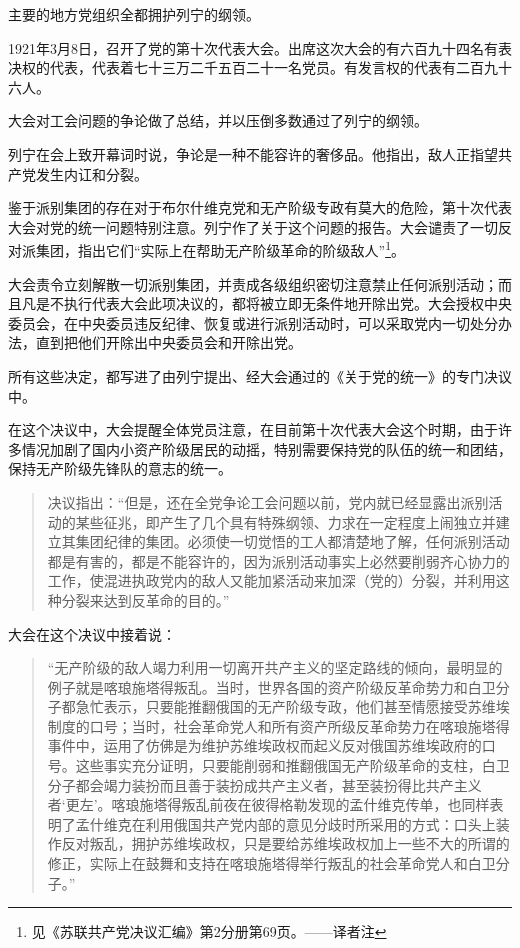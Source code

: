 主要的地方党组织全都拥护列宁的纲领。

1921年3月8日，召开了党的第十次代表大会。出席这次大会的有六百九十四名有表决权的代表，代表着七十三万二千五百二十一名党员。有发言权的代表有二百九十六人。

大会对工会问题的争论做了总结，并以压倒多数通过了列宁的纲领。

列宁在会上致开幕词时说，争论是一种不能容许的奢侈品。他指出，敌人正指望共产党发生内讧和分裂。

鉴于派别集团的存在对于布尔什维克党和无产阶级专政有莫大的危险，第十次代表大会对党的统一问题特别注意。列宁作了关于这个问题的报告。大会谴责了一切反对派集团，指出它们“实际上在帮助无产阶级革命的阶级敌人”\footnote{见《苏联共产党决议汇编》第2分册第69页。——译者注}。

大会责令立刻解散一切派别集团，并责成各级组织密切注意禁止任何派别活动；而且凡是不执行代表大会此项决议的，都将被立即无条件地开除出党。大会授权中央委员会，在中央委员违反纪律、恢复或进行派别活动时，可以采取党内一切处分办法，直到把他们开除出中央委员会和开除出党。

所有这些决定，都写进了由列宁提出、经大会通过的《关于党的统一》的专门决议中。

在这个决议中，大会提醒全体党员注意，在目前第十次代表大会这个时期，由于许多情况加剧了国内小资产阶级居民的动摇，特别需要保持党的队伍的统一和团结，保持无产阶级先锋队的意志的统一。

\begin{quotation}
决议指出：“但是，还在全党争论工会问题以前，党内就已经显露出派别活动的某些征兆，即产生了几个具有特殊纲领、力求在一定程度上闹独立并建立其集团纪律的集团。必须使一切觉悟的工人都清楚地了解，任何派别活动都是有害的，都是不能容许的，因为派别活动事实上必然要削弱齐心协力的工作，使混进执政党内的敌人又能加紧活动来加深（党的）分裂，并利用这种分裂来达到反革命的目的。”
\end{quotation}

大会在这个决议中接着说：

\begin{quotation}
“无产阶级的敌人竭力利用一切离开共产主义的坚定路线的倾向，最明显的例子就是喀琅施塔得叛乱。当时，世界各国的资产阶级反革命势力和白卫分子都急忙表示，只要能推翻俄国的无产阶级专政，他们甚至情愿接受苏维埃制度的口号；当时，社会革命党人和所有资产所级反革命势力在喀琅施塔得事件中，运用了仿佛是为维护苏维埃政权而起义反对俄国苏维埃政府的口号。这些事实充分证明，只要能削弱和推翻俄国无产阶级革命的支柱，白卫分子都会竭力装扮而且善于装扮成共产主义者，甚至装扮得比共产主义者‘更左’。喀琅施塔得叛乱前夜在彼得格勒发现的孟什维克传单，也同样表明了孟什维克在利用俄国共产党内部的意见分歧时所采用的方式：口头上装作反对叛乱，拥护苏维埃政权，只是要给苏维埃政权加上一些不大的所谓的修正，实际上在鼓舞和支持在喀琅施塔得举行叛乱的社会革命党人和白卫分子。”
\end{quotation}


